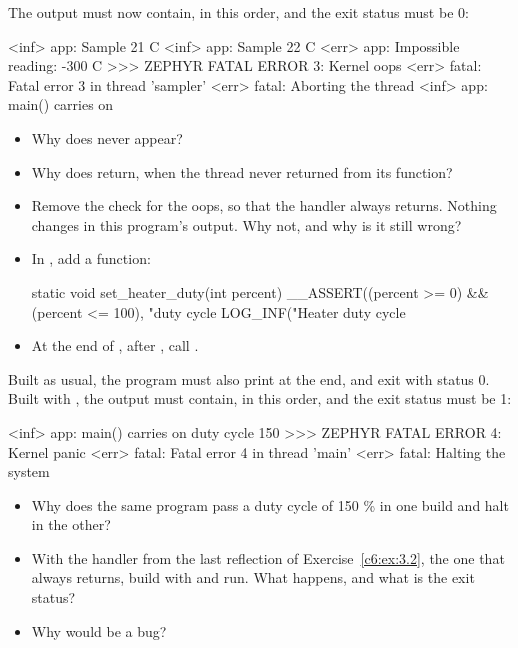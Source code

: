 The output must now contain, in this order, and the exit status must be 0:

\begin{console}
<inf> app: Sample 21 C
<inf> app: Sample 22 C
<err> app: Impossible reading: -300 C
>>> ZEPHYR FATAL ERROR 3: Kernel oops
<err> fatal: Fatal error 3 in thread 'sampler'
<err> fatal: Aborting the thread
<inf> app: main() carries on
\end{console}

\begin{itemize}
  \item Why does  never appear?
  \item Why does  return, when the thread never returned from its function?
  \item Remove the check for the oops, so that the handler always returns. Nothing changes in this program’s
    output. Why not, and why is it still wrong?
\end{itemize}

\label{c6:ex:3.3}

\begin{itemize}
  \item In , add a function:
\begin{ccode}
static void set_heater_duty(int percent)
{
  __ASSERT((percent >= 0) && (percent <= 100), "duty cycle %
  LOG_INF("Heater duty cycle %
}
\end{ccode}
  \item At the end of , after , call .
\end{itemize}

Built as usual, the program must also print  at the end,
and exit with status 0. Built with , the output must contain, in this order,
and the exit status must be 1:

\begin{console}
<inf> app: main() carries on
duty cycle 150 %
>>> ZEPHYR FATAL ERROR 4: Kernel panic
<err> fatal: Fatal error 4 in thread 'main'
<err> fatal: Halting the system
\end{console}

\begin{itemize}
  \item Why does the same program pass a duty cycle of 150 \% in one build and halt in the other?
  \item With the handler from the last reflection of Exercise~\ref{c6:ex:3.2}, the one that always returns,
    build with  and run. What happens, and what is the exit status?
  \item Why would  be a bug?
\end{itemize}

